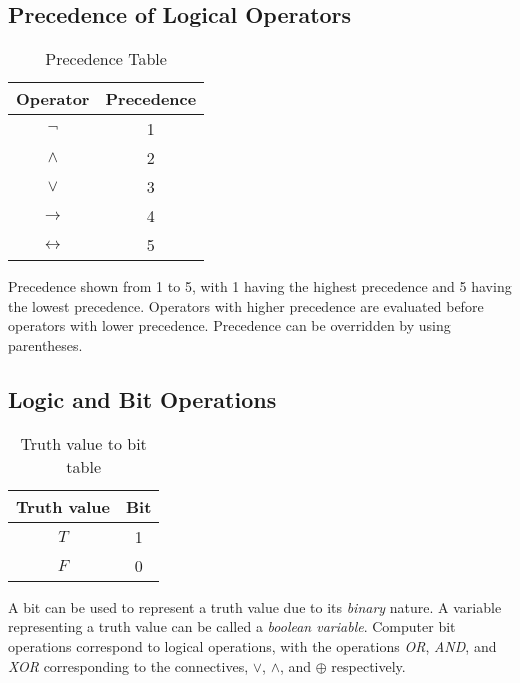 \documentclass[12pt letter]{report}
\begin{document}
\subsection{Precedence of Logical Operators}

\begin{table}[h!]
	\caption{Precedence Table}\label{tab:prec}
	\begin{center}
		\begin{tabular}{|c|c|}
			\hline
			Operator          & Precedence \\ [0.5ex]
			\hline
			\hline
			$\neg$            & 1          \\
			$\wedge$          & 2          \\
			$\vee$            & 3          \\
			$\to$             & 4          \\
			$\leftrightarrow$ & 5          \\
			\hline
		\end{tabular}
	\end{center}
\end{table}

Precedence shown from 1 to 5, with 1 having the highest precedence and 5 having the lowest precedence. Operators with
higher precedence are evaluated before operators with lower precedence. Precedence can be overridden by using parentheses.

\subsection{Logic and Bit Operations}


\begin{table}[h!]
	\caption{Truth value to bit table}\label{tab:bit}
	\begin{center}
		\begin{tabular}{|c|c|}
			\hline
			Truth value & Bit \\ [0.5ex]
			\hline
			\hline
			$T$         & 1   \\
			$F$         & 0   \\
			\hline
		\end{tabular}
	\end{center}
\end{table}

A bit can be used to represent a truth value due to its \textit{binary} nature. A variable representing a truth value
can be called a \textit{boolean variable}. Computer bit operations correspond to logical operations, with the operations
\textit{OR}, \textit{AND}, and \textit{XOR} corresponding to the connectives, $\vee$, $\wedge$, and $\oplus$ respectively.
\end{document}
